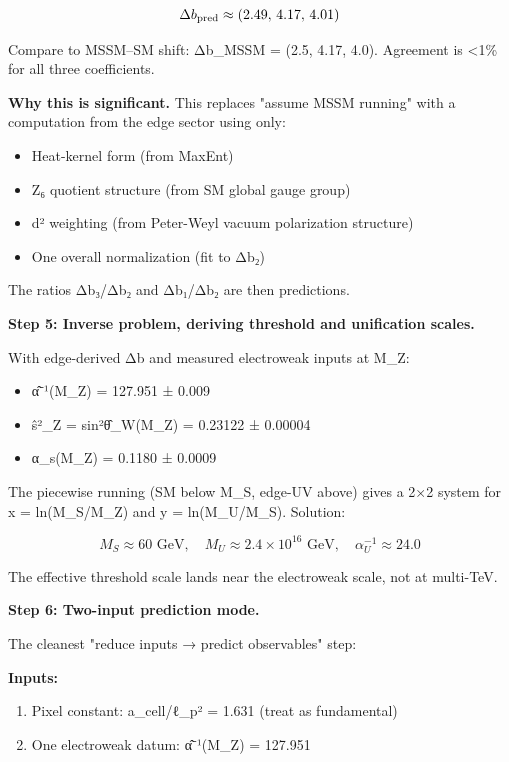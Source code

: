 \[
\Delta b_{\rm pred} \approx (2.49, \, 4.17, \, 4.01)
\]

Compare to MSSM--SM shift: Δb\_MSSM = (2.5, 4.17, 4.0). Agreement is \textless1\% for all three coefficients.

\textbf{Why this is significant.} This replaces "assume MSSM running" with a computation from the edge sector using only:

\begin{itemize}
\tightlist
\item
  Heat-kernel form (from MaxEnt)
\item
  Z₆ quotient structure (from SM global gauge group)
\item
  d² weighting (from Peter-Weyl vacuum polarization structure)
\item
  One overall normalization (fit to Δb₂)
\end{itemize}

The ratios Δb₃/Δb₂ and Δb₁/Δb₂ are then predictions.

\textbf{Step 5: Inverse problem, deriving threshold and unification scales.}

With edge-derived Δb and measured electroweak inputs at M\_Z:

\begin{itemize}
\tightlist
\item
  \^{α}⁻¹(M\_Z) = 127.951 ± 0.009
\item
  \^{s}²\_Z = sin²\^{θ}\_W(M\_Z) = 0.23122 ± 0.00004
\item
  α\_s(M\_Z) = 0.1180 ± 0.0009
\end{itemize}

The piecewise running (SM below M\_S, edge-UV above) gives a 2×2 system for x = ln(M\_S/M\_Z) and y = ln(M\_U/M\_S). Solution:

\[
M_S \approx 60 \text{ GeV}, \quad M_U \approx 2.4 \times 10^{16} \text{ GeV}, \quad \alpha_U^{-1} \approx 24.0
\]

The effective threshold scale lands near the electroweak scale, not at multi-TeV.

\textbf{Step 6: Two-input prediction mode.}

The cleanest "reduce inputs → predict observables" step:

\textbf{Inputs:}

\begin{enumerate}
\def\labelenumi{\arabic{enumi}.}
\tightlist
\item
  Pixel constant: a\_cell/ℓ\_p² = 1.631 (treat as fundamental)
\item
  One electroweak datum: \^{α}⁻¹(M\_Z) = 127.951
\end{enumerate}

